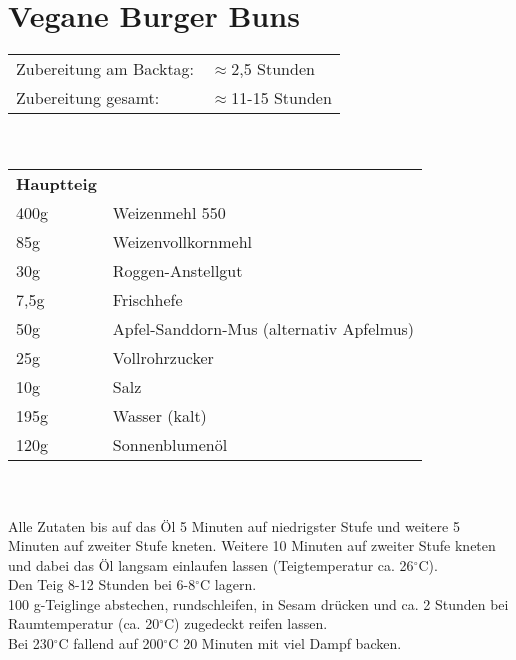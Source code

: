\section{Vegane Burger Buns}
\begin{tabular}{ll}
    Zubereitung am Backtag: & $\approx$2,5 Stunden   \\
    Zubereitung gesamt:     & $\approx$11-15 Stunden
\end{tabular}\\\paragraph*{}
\begin{tabular}{ll}
    \textbf{Hauptteig} \\
    400g & Weizenmehl 550                           \\
    85g  & Weizenvollkornmehl                       \\
    30g  & Roggen-Anstellgut                        \\
    7,5g & Frischhefe                               \\
    50g  & Apfel-Sanddorn-Mus (alternativ Apfelmus) \\
    25g  & Vollrohrzucker                           \\
    10g  & Salz                                     \\
    195g & Wasser (kalt)                            \\
    120g & Sonnenblumenöl                           \\
\end{tabular}\\\paragraph*{}
Alle Zutaten bis auf das Öl 5 Minuten auf niedrigster Stufe und weitere 5 Minuten auf zweiter Stufe kneten. Weitere 10 Minuten auf zweiter Stufe kneten und dabei das Öl langsam einlaufen lassen (Teigtemperatur ca. 26$^\circ$C).\\
Den Teig 8-12 Stunden bei 6-8$^\circ$C lagern.\\
100 g-Teiglinge abstechen, rundschleifen, in Sesam drücken und ca. 2 Stunden bei Raumtemperatur (ca. 20$^\circ$C) zugedeckt reifen lassen.\\
Bei 230$^\circ$C fallend auf 200$^\circ$C 20 Minuten mit viel Dampf backen.
\newpage


